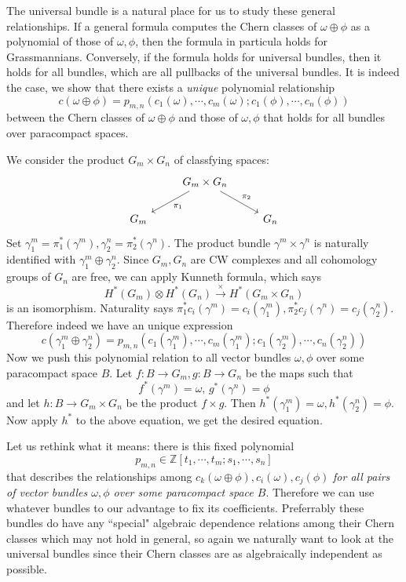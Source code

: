 \documentclass[12pt]{article}
\theoremstyle{plain}
\theoremstyle{definition}
\newcommand{\IZ}{\mathbb{Z}}
\newcommand\tensor{{\otimes}}
\newcommand{\<}{\langle}
\renewcommand{\>}{\rangle}
\newcommand{\w}{\omega}
\begin{document}
The universal bundle is a natural place for us to study these general relationships. If a general formula computes the Chern classes of $\w \oplus \phi$ as a polynomial of those of $\w, \phi$, then the formula in particula holds for Grassmannians. Conversely, if the formula holds for universal bundles, then it holds for all bundles, which are all pullbacks of the universal bundles. It is indeed the case, we show that there exists a \textit{unique} polynomial relationship
$$ c(\w \oplus \phi) = p_{m, n}(c_1(\w), \cdots, c_m(\w); c_1(\phi), \cdots, c_n(\phi))$$
between the  Chern classes of $\w \oplus \phi$ and those of $\w, \phi$ that holds for all bundles over paracompact spaces. 

We consider the product $G_m \times G_n$ of classfying spaces:
\[
\begin{tikzcd}
{} & G_m \times G_n \arrow{dl}{\pi_1}  \arrow{dr}{\pi_2} \\
G_m && G_n
\end{tikzcd}
\]
Set $\gamma_1^m = \pi_1^*( \gamma^m), \gamma_2^n = \pi_2^*(\gamma^n)$. The product bundle $\gamma^m \times \gamma^n$ is naturally identified with $\gamma_1^m \oplus \gamma_2^n$. Since $G_m, G_n$ are CW complexes and all cohomology groups of $G_n$ are free, we can apply Kunneth formula, which says 
$$ H^*(G_m) \tensor H^*(G_n) \stackrel{\times}{\longrightarrow} H^*(G_m \times G_n) $$
is an isomorphism. Naturality says $\pi_1^* c_i(\gamma^m) = c_i(\gamma_1^m), \pi_2^* c_j(\gamma^n) = c_j(\gamma_2^n)$. Therefore indeed we have an unique expression 
$$ c(\gamma_1^m \oplus \gamma_2^n) = p_{m,n}(c_1(\gamma^m_1), \cdots, c_m(\gamma_1^m); c_1(\gamma_2^m), \cdots, c_n(\gamma_2^n)) $$
Now we push this polynomial relation to all vector bundles $\w, \phi$ over some paracompact space $B$. Let $f : B \to G_m, g: B \to G_n$ be the maps such that $$f^*(\gamma^m) = \w, \, g^*(\gamma^n) = \phi$$ and let $h : B \to G_m \times G_n$ be the product $f \times g$. Then $h^*(\gamma^m_1) = \w, h^*(\gamma_2^n) = \phi$. Now apply $h^*$ to the above equation, we get the desired equation. 

Let us rethink what it means: there is this fixed polynomial 
$$ p_{m, n} \in \IZ[t_1, \cdots, t_m; s_1, \cdots, s_n]$$ that describes the relationships among $c_k(\w \oplus \phi), c_i(\w), c_j(\phi)$ \textit{for all pairs of vector bundles $\w, \phi$ over some paracompact space $B$}. Therefore we can use whatever bundles to our advantage to fix its coefficients. Preferrably these bundles do have any ``special" algebraic dependence relations among their Chern classes which may not hold in general, so again we naturally want to look at the universal bundles since their Chern classes are as algebraically independent as possible. 
\end{document}

